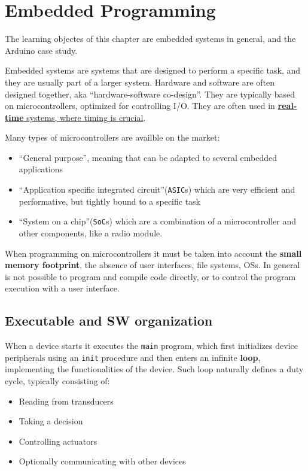 \chapter{Embedded Programming}
The learning objectes of this chapter are embedded systems in general, and the Arduino case study.

Embedded systems are systems that are designed to perform a specific task, and they are usually part of a larger system.
Hardware and software are often designed together, aka ``hardware-software co-design''.
They are typically based on microcontrollers, optimized for controlling I/O.
They are often used in \ul{\textbf{real-time} systems, where timing is crucial}.

Many types of microcontrollers are availble on the market:
\begin{itemize}
   \item ``General purpose'', meaning that can be adapted to several embedded applications
   \item ``Application specific integrated circuit''(\texttt{ASIC}s) which are very efficient and performative, but tightly bound to a specific task
   \item ``System on a chip''(\texttt{SoC}s) which are a combination of a microcontroller and other components, like a radio module. 
\end{itemize}

When programming on microcontrollers it must be taken into account the \textbf{small memory footprint}, the absence of user interfaces, file systems, OSs.
In general is not possible to program and compile code directly, or to control the program execution with a user interface.


\section{Executable and SW organization}
When a device starts it executes the \texttt{main} program, which first initializes device peripherals using an \texttt{init} procedure and then enters an infinite \textbf{loop}, implementing the functionalities of the device.
Such loop naturally defines a duty cycle, typically consisting of:
{\ns\begin{itemize}
   \item Reading from transducers
   \item Taking a decision
   \item Controlling actuators
   \item Optionally communicating with other devices
\end{itemize}}

